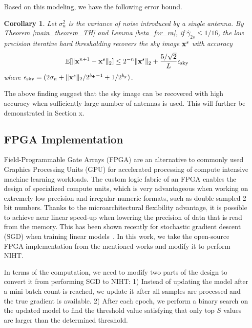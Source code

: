 \documentclass{article}
\newtheorem{corollary}{Corollary}
\begin{document}
Based on this modeling, we have the following error bound.
\begin{corollary}
Let $\sigma_n^2$ is the variance of noise introduced by a single antenna. By Theorem \ref{main_theorem_TH} and Lemma \ref{beta_for_ra}, if $\hat{\gamma}_{2s}\leq 1/16$, the low precision iterative hard thresholding recovers the sky image ${\bf x}^s$ with accuracy
\begin{equation}
    \mathbb{E}[\|{\bf x}^{n+1} - {\bf x}^s \|_2] \leq 2^{-n}\| {\bf x}^s\|_2 + \frac{5/\sqrt{2}}{L} \epsilon_{\rm{sky}}
\end{equation}
where $\epsilon_{\rm{sky}} = (2\sigma_n + \|{\bf x}^s \|_2/2^{b_{\bf \Phi}-1} + 1/2^{b_{\bf y}})$.
\end{corollary}
The above finding suggest that the sky image can be recovered with high accuracy when sufficiently large number of antennas is used. This will further be demonstrated in Section x.


\subsection{FPGA Implementation}
Field-Programmable Gate Arrays (FPGA) are an alternative to commonly used Graphics Processing Units (GPU) for accelerated processing of compute intensive machine learning workloads. The custom logic fabric of an FPGA enables the design of specialized compute units, which is very advantageous when working on extremely low-precision and irregular numeric formats, such as double sampled 2-bit numbers. Thanks to the microarchitectural flexibility advantage, it is possible to achieve near linear speed-up when lowering the precision of data that is read from the memory. This has been shown recently for stochastic gradient descent (SGD) when training linear models~\cite{zhang2017zipml, kara2017fpga}. In this work, we take the open-source FPGA implementation from the mentioned works and modify it to perform NIHT.

In terms of the computation, we need to modify two parts of the design to convert it from performing SGD to NIHT: 1) Instead of updating the model after a mini-batch count is reached, we update it after all samples are processed and the true gradient is available. 2) After each epoch, we perform a binary search on the updated model to find the threshold value satisfying that only top $S$ values are larger than the determined threshold.
\end{document}
